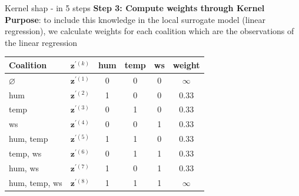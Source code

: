 \documentclass[11pt,compress,t,notes=noshow, aspectratio=169, xcolor=table]{beamer}
\begin{document}
\begin{frame}{Kernel shap - in 5 steps}
\textbf{Step 3: Compute weights through Kernel}\\\medskip
\textbf{Purpose}: to include this knowledge in the local surrogate model (linear regression), we calculate weights for each coalition which are the observations of the linear regression

\begin{table}[]
    \centering
        \begin{tabular}{l |c|ccc|c}
 Coalition & $\mathbf{z}^{\prime (k)}$ &  hum & temp & ws & weight\\
  \hline 
  $\varnothing$ & $\mathbf{z}^{\prime (1)}$ & 0 & 0 & 0 & $\infty$ \\
  hum & $\mathbf{z}^{\prime (2)}$ & 1 & 0 & 0 & 0.33 \\
  temp &  $\mathbf{z}^{\prime (3)}$ & 0 & 1 & 0 & 0.33 \\
  ws &   $\mathbf{z}^{\prime (4)}$ & 0 & 0 & 1 & 0.33  \\
  hum, temp & $\mathbf{z}^{\prime (5)}$ & 1 & 1 & 0 & 0.33 \\
  temp, ws & $\mathbf{z}^{\prime (6)}$ & 0 & 1 & 1 & 0.33 \\
  hum, ws &   $\mathbf{z}^{\prime (7)}$ & 1 & 0 & 1 & 0.33 \\
  hum, temp, ws & $\mathbf{z}^{\prime (8)}$ & 1 & 1 & 1 & $\infty$ \\
  
 
  \end{tabular}
\end{table}
\medskip
{}

  
\end{frame}
\end{document}
